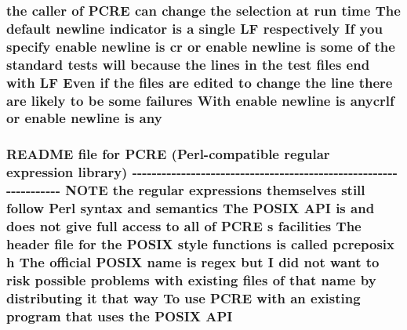 \subsubsection[{\texorpdfstring{any}{any}}]{\setlength{\rightskip}{0pt plus 5cm}the caller {\bf of} {\bf P\+C\+RE} {\bf can} change the selection at {\bf run} {\bf time} The {\bf default} {\bf newline} indicator {\bf is} {\bf a} single {\bf LF} {\bf respectively} If you specify enable {\bf newline} {\bf is} {\bf cr} {\bf or} enable {\bf newline} {\bf is} some {\bf of} the standard {\bf tests} will because the {\bf lines} {\bf in} the test {\bf files} {\bf end} {\bf with} {\bf LF} Even {\bf if} the {\bf files} {\bf are} edited {\bf to} change the {\bf line} there {\bf are} likely {\bf to} {\bf be} some failures With enable {\bf newline} {\bf is} anycrlf {\bf or} enable {\bf newline} {\bf is} any}\hypertarget{README_8txt_a117db88886e3b44e72c9457ba51928bc}{}\label{README_8txt_a117db88886e3b44e72c9457ba51928bc}
\subsubsection[{\texorpdfstring{A\+PI}{API}}]{\setlength{\rightskip}{0pt plus 5cm}R\+E\+A\+D\+ME {\bf file} for {\bf P\+C\+RE} ({\bf Perl}-\/compatible regular {\bf expression} {\bf library}) -\/-\/-\/-\/-\/-\/-\/-\/-\/-\/-\/-\/-\/-\/-\/-\/-\/-\/-\/-\/-\/-\/-\/-\/-\/-\/-\/-\/-\/-\/-\/-\/-\/-\/-\/-\/-\/-\/-\/-\/-\/-\/-\/-\/-\/-\/-\/-\/-\/-\/-\/-\/-\/-\/-\/-\/-\/-\/-\/-\/-\/-\/-\/-\/-\/ {\bf N\+O\+TE} the regular {\bf expressions} {\bf themselves} {\bf still} follow {\bf Perl} syntax and semantics The P\+O\+S\+IX A\+PI {\bf is} and does {\bf not} give full access {\bf to} {\bf all} {\bf of} {\bf P\+C\+RE} {\bf s} facilities The header {\bf file} for the P\+O\+S\+IX {\bf style} {\bf functions} {\bf is} called pcreposix {\bf h} The official P\+O\+S\+IX {\bf name} {\bf is} {\bf regex} but {\bf I} did {\bf not} want {\bf to} risk {\bf possible} problems {\bf with} existing {\bf files} {\bf of} that {\bf name} by distributing {\bf it} that {\bf way} To use {\bf P\+C\+RE} {\bf with} an existing {\bf program} that uses the P\+O\+S\+IX A\+PI}\hypertarget{README_8txt_a86b26159378dda23ae21b97960e3cf31}{}\label{README_8txt_a86b26159378dda23ae21b97960e3cf31}

